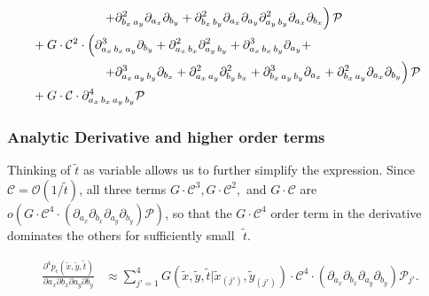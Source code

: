 \documentclass{beamer}
\begin{document}
\begin{frame}
\begin{align*}
  \MoveEqLeft[15] \left. \qquad\qquad\qquad +\partial^2_{b_x\, a_y} \partial_{a_x} \partial_{b_y} + \partial^2_{b_x\, b_y} \partial_{a_x} \partial_{a_y} \partial^2_{a_y\, b_y} \partial_{a_x} \partial_{b_x} \right) \mathcal{P} &  \nonumber \\
  \MoveEqLeft[15] \,\, + G \cdot \mathcal{C}^2 \cdot \left( \partial^3_{a_x\,b_x\,a_y} \partial_{b_y} + \partial^2_{a_x\,b_x}\partial^2_{a_y\,b_y} + \partial^3_{a_x\,b_x\,b_y}\partial_{a_y}  + \right.& \nonumber \\
  \MoveEqLeft[15] \left. \qquad\qquad\qquad + \partial^3_{a_x\,a_y\,b_y} \partial_{b_x} + \partial^2_{a_x\,a_y} \partial^2_{b_y\,b_x} + \partial^3_{b_x\,a_y\,b_y}\partial_{a_x} + \partial^2_{b_x\,a_y}\partial_{a_x}\partial_{b_y} \right) \mathcal{P} & \nonumber \\
  \MoveEqLeft[15] \,\, + G \cdot \mathcal{C} \cdot \partial^4_{a_x\,b_x\,a_y\,b_y} \mathcal{P}& \label{eq:fourth-deriv}
\end{align*}
\end{frame}
\begin{frame}
  \frametitle{Analytic Derivative and higher order terms}

  Thinking of $\tilde{t}$ as variable allows us to further simplify
  the expression. Since $\mathcal{C} = \mathcal{O}(1/\tilde{t})$, all
  three terms $G\cdot \mathcal{C}^3, G\cdot \mathcal{C}^2,$ and
  $G\cdot \mathcal{C}$ are
  $o\left( G\cdot \mathcal{C}^4 \cdot
    \left(\partial_{a_x}\partial_{b_x} \partial_{a_y}\partial_{b_y}
    \right)\mathcal{P} \right)$, so that the $G\cdot \mathcal{C}^4$
  order term in the derivative dominates the others for sufficiently
  small $\,\,\tilde{t}$.

  \begin{align*}
  \frac{\partial^4 p_\epsilon(\tilde{x}, \tilde{y}, \tilde{t})}{\partial a_x
  \partial b_x \partial a_y \partial b_y} &\approx \sum_{j'=1}^{4} G(\tilde{x},\tilde{y},\tilde{t}|\tilde{x}_{(j')},\tilde{y}_{(j')}) \cdot \mathcal{C}^4 \cdot \left(\partial_{a_x}\partial_{b_x} \partial_{a_y}\partial_{b_y} \right)\mathcal{P}_{j'}. 
\end{align*}
\end{frame}
\end{document}
